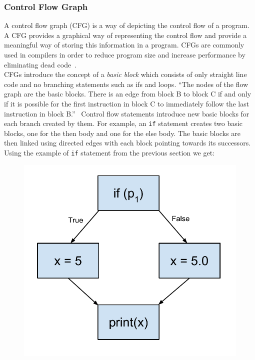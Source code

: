 \documentclass[12pt, titlepage]{article}
\begin{document}
\subsubsection{Control Flow Graph}
\label{chap:cfgs}
A control flow graph (CFG) is a way of depicting the control flow of a program. A CFG provides a graphical way of representing the control flow and provide a meaningful way of storing this information in a program. CFGs are commonly used in compilers in order to reduce program size and increase performance by eliminating dead code~\cite{dragonBook}. \\
\indent CFGs introduce the concept of a \textit{basic block} which consists of only straight line code and no branching statements such as ifs and loops. ``The nodes of the flow 
graph are the basic blocks. There is an edge from block B to block C if and 
only if it is possible for the first instruction in block C to immediately follow 
the last instruction in block B.''~\cite{dragonBook} Control flow statements introduce new basic blocks for each branch created by them. For example, an \texttt{if} statement creates two basic blocks, one for the then body and one for the else body. The basic blocks are then linked using directed edges with each block pointing towards its successors. \\
\indent Using the example of \texttt{if} statement from the previous section we get:
\begin{figure}[h]
\centering
\includegraphics[scale=0.4]{images/controlFlowGraph.pdf}
\end{figure}  \\
\end{document}
